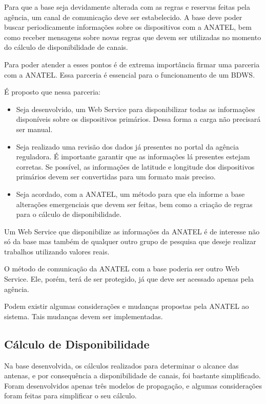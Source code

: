 	Para que a base seja devidamente alterada com as regras e reservas feitas pela agência, um canal de comunicação deve ser estabelecido. A base deve poder buscar periodicamente informações sobre os dispositivos com a ANATEL, bem como receber mensagens sobre novas regras que devem ser utilizadas no momento do cálculo de disponibilidade de canais.

	Para poder atender a esses pontos é de extrema importância firmar uma parceria com a ANATEL. Essa parceria é essencial para o funcionamento de um BDWS.	

É proposto que nessa parceria:

\begin{itemize}
\item Seja desenvolvido, um Web Service para disponibilizar todas as informações disponíveis sobre os dispositivos primários. Dessa forma a carga não precisará ser manual.
\item Seja realizado uma revisão dos dados já presentes no portal da agência reguladora. É importante garantir que as informações lá presentes estejam corretas. Se possível, as informações de latitude e longitude dos dispositivos primários devem ser convertidas para um formato mais preciso.
\item Seja acordado, com a ANATEL, um método para que ela informe a base alterações emergenciais que devem ser feitas, bem como a criação de regras para o cálculo de disponibilidade.
\end{itemize}

	Um Web Service que disponibilize as informações da ANATEL é de interesse não só da base mas também de qualquer outro grupo de pesquisa que deseje realizar trabalhos utilizando valores reais. 

	O método de comunicação da ANATEL com a base poderia ser outro Web Service. Ele, porém, terá de ser protegido, já que deve ser acessado apenas pela agência.

	Podem existir algumas considerações e mudanças propostas pela ANATEL ao sistema. Tais mudanças devem ser implementadas.


\subsection{Cálculo de Disponibilidade}

	Na base desenvolvida, os cálculos realizados para determinar o alcance das antenas, e por consequência a disponibilidade de canais, foi bastante simplificado. Foram desenvolvidos apenas três modelos de propagação, e algumas considerações foram feitas para simplificar o seu cálculo.


